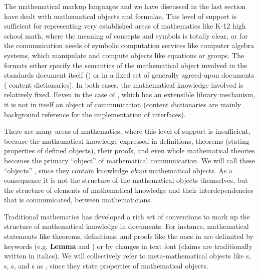The mathematical markup languages {\openmath} and {\mathml} we have discussed in
the last section have dealt with mathematical objects and formulae.  This level of
support is sufficient for representing very established areas of mathematics like
K-12 high school math, where the meaning of concepts and symbols is totally clear,
or for the communication needs of symbolic computation services like computer
algebra systems, which manipulate and compute objects like equations or groups.
The formats either specify the semantics of the mathematical object involved in
the standards document itself ({\mathml}) or in a fixed set of generally
agreed-upon documents ({\openmath} content dictionaries). In both cases, the mathematical knowledge involved is relatively
fixed. Eeven in the case of {\openmath}, which has an extensible library
mechanism, it is not in itself an object of communication (content dictionaries
are mainly background reference for the implementation of {\openmath} interfaces).

There are many areas of mathematics, where this level of support is insufficient,
because the mathematical knowledge expressed in definitions, theorems (stating
properties of defined objects), their proofs, and even whole mathematical theories
becomes the primary ``object'' of mathematical communication. We will call these
``objects'' {},
since they contain knowledge {\em{about\/}} mathematical objects. As a consequence
it is not the structure of the mathematical objects themselves, but the structure
of elements of mathematical knowledge and their interdependencies that is
communicated, between mathematicians.

Traditional mathematics has developed a rich set of conventions to mark up the
structure of mathematical
knowledge in
documents. For instance,
mathematical
statements like
theorems, definitions, and proofs like the ones in {} are
delimited by keywords (e.g. {\bf Lemma} and {\boexchen}) or by changes in text
font (claims are traditionally written in italics). We will collectively refer to
meta-mathematical objects like {s}, {s},
{s}, and {s} as {}, since they state properties of
mathematical objects.

